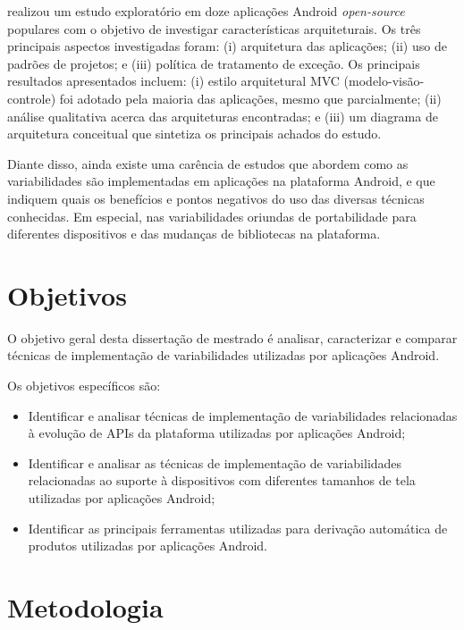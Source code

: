  realizou um estudo exploratório em doze aplicações Android
\textit{open-source}
populares com o objetivo de investigar características arquiteturais. Os três
principais aspectos investigadas foram: (i) arquitetura das aplicações;
(ii) uso de padrões de projetos; e (iii) política de tratamento de exceção.
Os principais resultados apresentados incluem: (i) estilo arquitetural MVC
(modelo-visão-controle) foi adotado pela maioria das aplicações,
mesmo que parcialmente; (ii) análise qualitativa acerca das arquiteturas encontradas;
e (iii) um diagrama de arquitetura conceitual que sintetiza os principais achados do estudo.

Diante disso, ainda existe uma carência de estudos que abordem como as variabilidades
são implementadas em aplicações na plataforma Android, e que indiquem quais os
benefícios e pontos negativos do uso das diversas técnicas conhecidas. Em especial,
nas variabilidades oriundas de portabilidade para diferentes dispositivos e das
mudanças de bibliotecas na plataforma.

\section{Objetivos}
O objetivo geral desta dissertação de mestrado é analisar, caracterizar e comparar
técnicas de implementação de variabilidades utilizadas por aplicações Android.

Os objetivos específicos são:
\begin{itemize}
    \item Identificar e analisar técnicas de implementação de variabilidades
        relacionadas à evolução de APIs da plataforma utilizadas por aplicações Android;
    \item Identificar e analisar as técnicas de implementação de variabilidades
        relacionadas ao suporte à dispositivos com diferentes tamanhos de tela utilizadas por aplicações Android;
    \item Identificar as principais ferramentas utilizadas para derivação automática
        de produtos utilizadas por aplicações Android.
\end{itemize}

\section{Metodologia}

